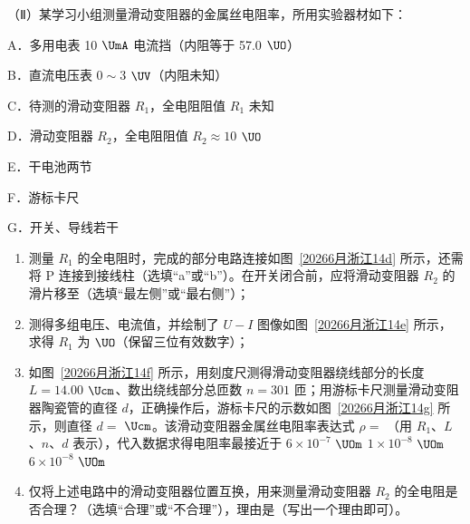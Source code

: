 \documentclass[\gkver]{gaokaozhenti}
\begin{document}
\begin{enumerate}
（Ⅱ）某学习小组测量滑动变阻器的金属丝电阻率，所用实验器材如下：

A．多用电表 10 $\UmA$ 电流挡（内阻等于 57.0 $\UO$）

B．直流电压表 $0\sim3$ $\UV$（内阻未知）

C．待测的滑动变阻器 $R_{1}$，全电阻阻值 $R_{1}$ 未知

D．滑动变阻器 $R_{2}$，全电阻阻值 $R_{2}\approx10$ $\UO$

E．干电池两节

F．游标卡尺

G．开关、导线若干
\begin{enumerate}
    \item
    测量 $R_{1}$ 的全电阻时，完成的部分电路连接如图~\ref{20266月浙江14d} 所示，还需将 P 连接到接线柱（选填“a”或“b”）。在开关闭合前，应将滑动变阻器 $R_{2}$ 的滑片移至（选填“最左侧”或“最右侧”）；
    \item
    测得多组电压、电流值，并绘制了 $U-I$ 图像如图~\ref{20266月浙江14e} 所示，求得 $R_{1}$ 为 $\UO$（保留三位有效数字）；
    \item
    如图~\ref{20266月浙江14f} 所示，用刻度尺测得滑动变阻器绕线部分的长度 $L=14.00$ $\Ucm$、数出绕线部分总匝数 $n=301$ 匝；用游标卡尺测量滑动变阻器陶瓷管的直径 $d$，正确操作后，游标卡尺的示数如图~\ref{20266月浙江14g} 所示，则直径 $d=$  $\Ucm$。该滑动变阻器金属丝电阻率表达式 $\rho=$ （用 $R_{1}$、$L$、$n$、$d$ 表示），代入数据求得电阻率最接近于
    {$6\times10^{-7}$ $\UOm$}
    {$1\times10^{-8}$ $\UOm$}
    {$6\times10^{-8}$ $\UOm$}
    \item
    仅将上述电路中的滑动变阻器位置互换，用来测量滑动变阻器 $R_{2}$ 的全电阻是否合理？（选填“合理”或“不合理”），理由是（写出一个理由即可）。
\end{enumerate}


\end{enumerate}
\end{document}
